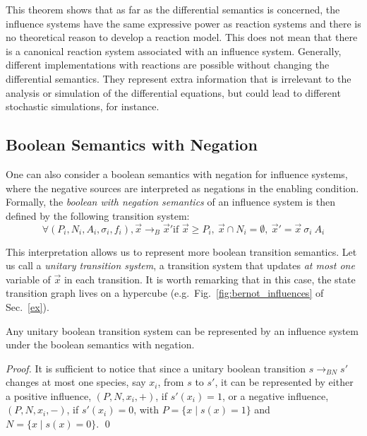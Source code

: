 \documentclass{llncs}
\newcommand{\I}[1]{\mathit{#1}}
\newcommand{\lra}{\longrightarrow}
\begin{document}
This theorem shows that as far as the differential semantics is concerned,
the influence systems have the same expressive power as reaction systems
and there is no theoretical reason to develop a reaction model.
This does not mean that there is a canonical reaction system associated with an influence system.
Generally, different implementations with reactions are possible without changing the differential semantics.
They represent extra information that is irrelevant to the analysis or simulation of the differential equations,
but could lead to different stochastic simulations, for instance.


\subsection{Boolean Semantics with Negation}

One can also consider a boolean semantics with negation for influence systems,
where the negative sources are interpreted as negations in the enabling condition.
Formally, the \emph{boolean with negation semantics} of an influence system is then defined by the following transition system:
$$\forall (P_i, N_i, A_i, \sigma_i, f_i), {\vec       x}\lra_B{\vec x'}\text{
if }{\vec x}\geq P_i,\ {\vec x}\cap N_i=\emptyset,\ {\vec x'} =       {\vec x}\ \sigma_i\ A_i$$

This interpretation allows us to represent more boolean transition semantics.
Let us call a \emph{unitary transition system}, a transition system that updates \emph{at most one} variable of $\vec x$ in each transition.
It is worth remarking that in this case, the state transition graph lives on a hypercube (e.g.~Fig.~\ref{fig:bernot_influences} of Sec.~\ref{ex}).



\begin{proposition}\label{propUnitary}
  Any unitary boolean transition system can be represented
  by an influence system under the boolean semantics with negation.
\end{proposition}
\begin{proof}
It is sufficient to notice that since a unitary boolean transition 
$s \longrightarrow_{\I{BN}} s'$ changes at most one species, say $x_i$, from $s$ to $s'$,
it can be represented by either a positive influence, $(P,N,x_i,+)$, if $s'(x_i)=1$,
or a negative influence, $(P,N,x_i,-)$, if $s'(x_i)=0$,
with $P=\{x \mid s(x)=1\}$ and $N=\{x \mid s(x)=0\}$.
\qed
\end{proof}
\end{document}
